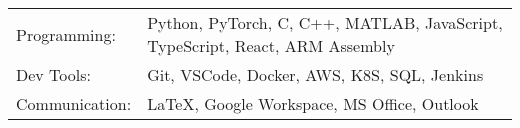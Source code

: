\begin{tabularx}{\linewidth}{@{}l X@{}}
Programming: &  \normalsize{Python, PyTorch, C, C++, MATLAB, JavaScript, TypeScript, React, ARM Assembly}\\
Dev Tools:  &  \normalsize{Git, VSCode, Docker, AWS, K8S, SQL, Jenkins}\\
Communication: & \normalsize{LaTeX, Google Workspace, MS Office, Outlook}
\end{tabularx}